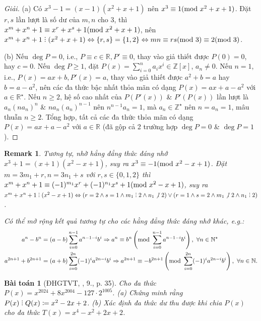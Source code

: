\documentclass{article}
\newtheorem{baitoan}{Bài toán}
\newtheorem{remark}{Remark}
\DeclareRobustCommand{\divby}{%
	\mathrel{\vbox{\baselineskip.65ex\lineskiplimit0pt\hbox{.}\hbox{.}\hbox{.}}}%
}
\begin{document}
\begin{proof}[Giải]
	(a) Có $x^3 - 1 = (x - 1)(x^2 + x + 1)$ nên $x^3\equiv1({\rm mod}\ x^2 + x + 1)$. Đặt $r,s$ lần lượt là số dư của $m,n$ cho 3, thì $x^m + x^n + 1\equiv x^r + x^s + 1({\rm mod}\ x^2 + x + 1)$, nên $x^m + x^n + 1\divby(x^2 + x + 1)\Leftrightarrow\{r,s\} = \{1,2\}\Leftrightarrow mn\equiv rs({\rm mod}\ 3)\equiv2({\rm mod}\ 3)$.
	\item(b) Nếu $\deg P = 0$, i.e., $P\equiv c\in\mathbb{R},P'\equiv0$, thay vào giả thiết được $P(0) = 0$, hay $c = 0$. Nếu $\deg P\ge1$, đặt $P(x) = \sum_{i=0}^n a_ix^i\in\mathbb{Z}[x]$, $a_n\ne0$. Nếu $n = 1$, i.e., $P(x) = ax + b,P'(x) = a$, thay vào giả thiết được $a^2 + b = a$ hay $b = a - a^2$, nên các đa thức bậc nhất thỏa mãn có dạng $P(x) = ax + a - a^2$ với $a\in\mathbb{R}^\star$. Nếu $n\ge2$, hệ số cao nhất của $P(P'(x))$ \& $P'(P(x))$ lần lượt là $a_n(na_n)^n$ \& $na_n(a_n)^{n-1}$ nên $n^{n-1}a_n = 1$, mà $a_n\in\mathbb{Z}^\star$ nên $n = a_n = 1$, mâu thuẫn $n\ge2$. Tổng hợp, tất cả các đa thức thỏa mãn có dạng $P(x) = ax + a - a^2$ với $a\in\mathbb{R}$ (đã gộp cả 2 trường hợp $\deg P = 0$ \& $\deg P = 1$).
\end{proof}

\begin{remark}
	Tương tự, nhờ hẳng đẳng thức đáng nhớ $x^3 + 1 = (x + 1)(x^2 - x + 1)$, suy ra $x^3\equiv-1({\rm mod}\ x^2 - x + 1)$. Đặt $m = 3m_1 + r,n = 3n_1 + s$ với $r,s\in\{0,1,2\}$ thì $x^m + x^n + 1\equiv(-1)^{m_1}x^r + (-1)^{n_1}x^s + 1({\rm mod}\ x^2 - x + 1)$, suy ra $x^m + x^n + 1\divby(x^2 - x + 1)\Leftrightarrow(r = 2\land s = 1\land m_1\divby2\land n_1\not{\divby}\ 2)\lor(r = 1\land s = 2\land m_1\not{\divby}\ 2\land n_1\divby2)$.
	
	Có thể mở rộng kết quả tương tự cho các hằng đẳng thức đáng nhớ khác, e.g.:
	\begin{align*}
		a^n - b^n &= (a - b)\sum_{i=0}^{n-1} a^{n - 1 - i}b^i\Rightarrow a^n\equiv b^n\left({\rm mod}\ \sum_{i=0}^{n-1} a^{n - 1 - i}b^i\right),\ \forall n\in\mathbb{N}^\star\\
		a^{2n + 1} + b^{2n + 1} &= (a + b)\sum_{i=0}^{2n} (-1)^ia^{2n - i}b^i\Rightarrow a^{2n + 1}\equiv-b^{2n + 1}\left({\rm mod}\ \sum_{i=0}^{2n} (-1)^ia^{2n - i}b^i\right),\ \forall n\in\mathbb{N}.
	\end{align*}
\end{remark}

\begin{baitoan}[ĐHGTVT, \cite{VMS_VMC2025}, 9., p. 35]
	Cho đa thức $P(x) = x^{2024} + 8x^{2004} - 127\cdot2^{1005}$. (a) Chứng minh rằng $P(x)\divby Q(x)\coloneqq x^2 - 2x + 2$. (b) Xác định đa thức dư thu được khi chia $P(x)$ cho đa thức $T(x) = x^4 - x^2 + 2x + 2$.
\end{baitoan}
\end{document}
